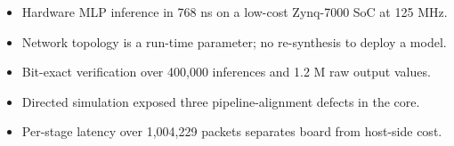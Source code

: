 %

\begin{itemize}
\item Hardware MLP inference in 768 ns on a low-cost Zynq-7000 SoC at 125 MHz.

\item Network topology is a run-time parameter; no re-synthesis to deploy a model.

\item Bit-exact verification over 400,000 inferences and 1.2 M raw output values.

\item Directed simulation exposed three pipeline-alignment defects in the core.

\item Per-stage latency over 1,004,229 packets separates board from host-side cost.
\end{itemize}
